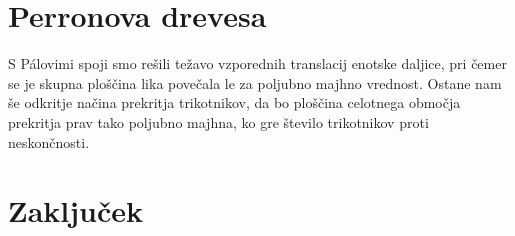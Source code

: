 \documentclass[a4paper, 12pt]{article}
\begin{document}
\section*{Perronova drevesa}

S Pálovimi spoji smo rešili težavo vzporednih translacij enotske daljice, pri čemer se je skupna ploščina lika povečala le za poljubno majhno vrednost. Ostane nam še odkritje načina prekritja trikotnikov, da bo ploščina celotnega območja prekritja prav tako poljubno majhna, ko gre število trikotnikov proti neskončnosti.




\section*{Zaključek}


\printbibliography[heading=bibintoc, title={Literatura}]

\end{document}
